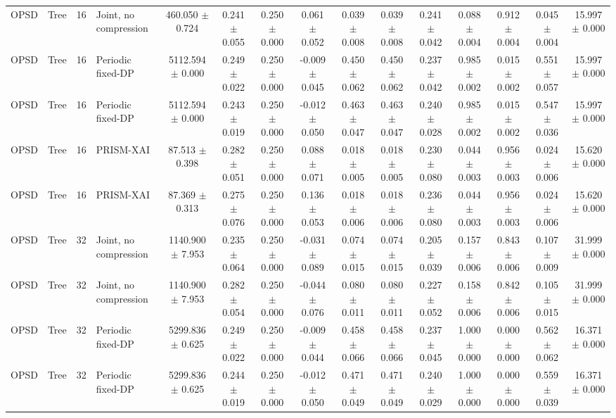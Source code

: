 \begin{table}[t]
\begin{tabular}{llllccccccccccc}
OPSD & Tree & 16 & Joint, no compression & 460.050 $\pm$ 0.724 & 0.241 $\pm$ 0.055 & 0.250 $\pm$ 0.000 & 0.061 $\pm$ 0.052 & 0.039 $\pm$ 0.008 & 0.039 $\pm$ 0.008 & 0.241 $\pm$ 0.042 & 0.088 $\pm$ 0.004 & 0.912 $\pm$ 0.004 & 0.045 $\pm$ 0.004 & 15.997 $\pm$ 0.000 \\
OPSD & Tree & 16 & Periodic fixed-DP & 5112.594 $\pm$ 0.000 & 0.249 $\pm$ 0.022 & 0.250 $\pm$ 0.000 & -0.009 $\pm$ 0.045 & 0.450 $\pm$ 0.062 & 0.450 $\pm$ 0.062 & 0.237 $\pm$ 0.042 & 0.985 $\pm$ 0.002 & 0.015 $\pm$ 0.002 & 0.551 $\pm$ 0.057 & 15.997 $\pm$ 0.000 \\
OPSD & Tree & 16 & Periodic fixed-DP & 5112.594 $\pm$ 0.000 & 0.243 $\pm$ 0.019 & 0.250 $\pm$ 0.000 & -0.012 $\pm$ 0.050 & 0.463 $\pm$ 0.047 & 0.463 $\pm$ 0.047 & 0.240 $\pm$ 0.028 & 0.985 $\pm$ 0.002 & 0.015 $\pm$ 0.002 & 0.547 $\pm$ 0.036 & 15.997 $\pm$ 0.000 \\
OPSD & Tree & 16 & PRISM-XAI & 87.513 $\pm$ 0.398 & 0.282 $\pm$ 0.051 & 0.250 $\pm$ 0.000 & 0.088 $\pm$ 0.071 & 0.018 $\pm$ 0.005 & 0.018 $\pm$ 0.005 & 0.230 $\pm$ 0.080 & 0.044 $\pm$ 0.003 & 0.956 $\pm$ 0.003 & 0.024 $\pm$ 0.006 & 15.620 $\pm$ 0.000 \\
OPSD & Tree & 16 & PRISM-XAI & 87.369 $\pm$ 0.313 & 0.275 $\pm$ 0.076 & 0.250 $\pm$ 0.000 & 0.136 $\pm$ 0.053 & 0.018 $\pm$ 0.006 & 0.018 $\pm$ 0.006 & 0.236 $\pm$ 0.080 & 0.044 $\pm$ 0.003 & 0.956 $\pm$ 0.003 & 0.024 $\pm$ 0.006 & 15.620 $\pm$ 0.000 \\
OPSD & Tree & 32 & Joint, no compression & 1140.900 $\pm$ 7.953 & 0.235 $\pm$ 0.064 & 0.250 $\pm$ 0.000 & -0.031 $\pm$ 0.089 & 0.074 $\pm$ 0.015 & 0.074 $\pm$ 0.015 & 0.205 $\pm$ 0.039 & 0.157 $\pm$ 0.006 & 0.843 $\pm$ 0.006 & 0.107 $\pm$ 0.009 & 31.999 $\pm$ 0.000 \\
OPSD & Tree & 32 & Joint, no compression & 1140.900 $\pm$ 7.953 & 0.282 $\pm$ 0.054 & 0.250 $\pm$ 0.000 & -0.044 $\pm$ 0.076 & 0.080 $\pm$ 0.011 & 0.080 $\pm$ 0.011 & 0.227 $\pm$ 0.052 & 0.158 $\pm$ 0.006 & 0.842 $\pm$ 0.006 & 0.105 $\pm$ 0.015 & 31.999 $\pm$ 0.000 \\
OPSD & Tree & 32 & Periodic fixed-DP & 5299.836 $\pm$ 0.625 & 0.249 $\pm$ 0.022 & 0.250 $\pm$ 0.000 & -0.009 $\pm$ 0.044 & 0.458 $\pm$ 0.066 & 0.458 $\pm$ 0.066 & 0.237 $\pm$ 0.045 & 1.000 $\pm$ 0.000 & 0.000 $\pm$ 0.000 & 0.562 $\pm$ 0.062 & 16.371 $\pm$ 0.000 \\
OPSD & Tree & 32 & Periodic fixed-DP & 5299.836 $\pm$ 0.625 & 0.244 $\pm$ 0.019 & 0.250 $\pm$ 0.000 & -0.012 $\pm$ 0.050 & 0.471 $\pm$ 0.049 & 0.471 $\pm$ 0.049 & 0.240 $\pm$ 0.029 & 1.000 $\pm$ 0.000 & 0.000 $\pm$ 0.000 & 0.559 $\pm$ 0.039 & 16.371 $\pm$ 0.000 \\

\end{tabular}
\end{table}
